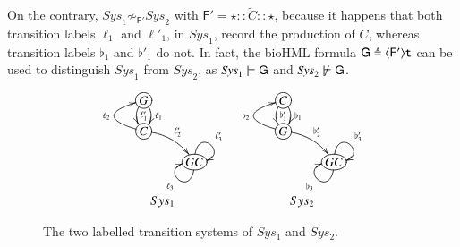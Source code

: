 On the contrary, $\mathit{Sys}_1 \not \sim_{\mathsf{F'}} \mathit{Sys}_2$  with $\mathsf{F'} =  \star :: \widetilde{C} :: \star $, 
because it happens that both  transition labels $\ell_1$  and $\ell'_1$, in $\mathit{Sys}_1$, record the production of $C$, whereas 
transition labels $\flat_1$ and $\flat'_1$ do not.
In fact, the bioHML formula $\mathsf{G}\triangleq \langle \mathsf{F'}\rangle{\tt t}$ can be used to distinguish $\mathit{Sys}_1$ from $\mathit{Sys}_2$, as $\mathit{Sys}_1\models \mathsf{G}$ and $\mathit{Sys}_2\not\models \mathsf{G}$.

\begin{figure}
\[
\begin{array}{cc}
\xymatrix@R-1pc{
*+[o][F-]{G} \ar@/ ^/[d]^{\ell_1} \ar@/_/[d]^{\ell'_1} \\
*+[o][F-]{C} \ar@/^2pc/[u]^{\ell_2} \ar@/^/[dr]^{\ell'_2} \\ %
& *+[o][F-]{GC}\ar@(d,l)^{\ell_3}\ar@(u,r)^{\ell'_3}
}
&
\xymatrix@R-1pc{
*+[o][F-]{C} \ar@/ ^/[d]^{\flat_1} \ar@/_/[d]^{\flat'_1} \\
*+[o][F-]{G} \ar@/^2pc/[u]^{\flat_2} \ar@/^/[dr]^{\flat'_2} \\ 
& *+[o][F-]{GC}\ar@(d,l)^{\flat_3}\ar@(u,r)^{\flat'_3}
}\\
Sys_1 & Sys_2
\end{array}
\]
\caption{The two labelled transition systems of $Sys_1$ and $Sys_2$.}\label{fig:ltss}
\end{figure}
